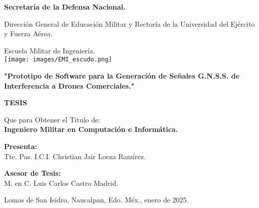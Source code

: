 \begin{titlepage}
    \begin{center}
        {\textbf{\fontsize{20pt}{30pt}\selectfont Secretaría de la Defensa Nacional.}}\\
        
        \vspace{0.5cm}
        
        {\fontsize{16pt}{24pt}\selectfont Dirección General de Educación Militar y Rectoría de la Universidad del Ejército y Fuerza Aérea.}\\
        
        \vspace{0.5cm}
        
        {\fontsize{16pt}{24pt}\selectfont Escuela Militar de Ingeniería.}\\
        
        
        \texttt{[image: images/EMI\_escudo.png]}

        {\textbf{\fontsize{14}{21}\selectfont "Prototipo de Software para la Generación de Señales G.N.S.S. de Interferencia a Drones Comerciales."}}\\
        
        \vspace{0.5cm}
        
        \begin{spacing}{1.0}
            {\textbf{\fontsize{14}{21}\selectfont TESIS}}\\
        \end{spacing}
        
        Que para Obtener el Titulo de:\\

        
        {\textbf{\fontsize{14}{21}\selectfont Ingeniero Militar en Computación e Informática.}}\\
        
        \vspace{0.5cm}
        
        {\textbf{\fontsize{14}{21}\selectfont Presenta:}}\\

        Tte. Pas. I.C.I. Christian Jair Loeza Ramírez.\\
        
        \vspace{0.5cm}
        
        {\textbf{\fontsize{14}{21}\selectfont Asesor de Tesis:}}\\

        M. en C. Luis Carlos Castro Madrid.\\
    \end{center}

    \begin{flushright}
        \vfill
        Lomas de San Isidro, Naucalpan, Edo. Méx., enero de 2025.
    \end{flushright}
\end{titlepage}